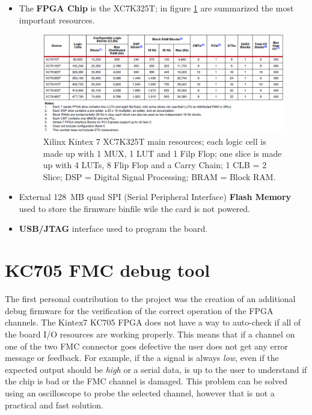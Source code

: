 \begin{itemize}
	\item The \textbf{FPGA Chip} is the XC7K325T; in figure \ref{fig:kintex7} are summarized the most important resources.
	\begin{figure}[H]
		\centering
		\includegraphics[width=0.9\linewidth]{IMG/ch3/KINTEX7}
		\caption{Xilinx Kintex 7 XC7K325T main resources; each logic cell is made up with 1 MUX, 1 LUT and 1 Filp Flop; one slice is made up with 4 LUTs, 8 Flip Flop and a Carry Chain; 1 CLB = 2 Slice; DSP = Digital Signal Processing; BRAM = Block RAM.}
		\label{fig:kintex7}
	\end{figure}
	\item External 128~MB quad SPI (Serial Peripheral Interface) \textbf{Flash Memory} used to store the firmware binfile wile the card is not powered.
	\item \textbf{USB/JTAG} interface used to program the board.
	
\end{itemize}

\section{KC705 FMC debug tool}
\noindent The first personal contribution to the project was the creation of an additional debug firmware for the verification of the correct operation of the FPGA channels. 
\newline
The Kintex7 KC705 FPGA does not have a way to auto-check if all of the board I/O resources are working properly.
This means that if a channel on one of the two FMC connector goes defective the user does not get any error message or feedback.
For example, if the a signal is always \textit{low}, even if the expected output should be \textit{high} or a serial data, is up to the user to understand if the chip is bad or the FMC channel is damaged.
This problem can be solved using an oscilloscope to probe the selected channel, however that is not a practical and fast solution.
